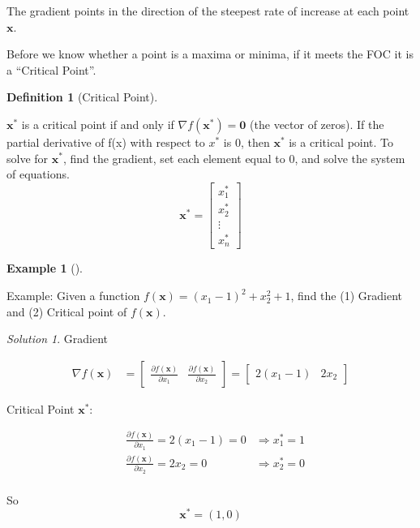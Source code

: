 \documentclass[
  letterpaper,
]{book}
\theoremstyle{definition}
\newtheorem{definition}{Definition}[chapter]
\theoremstyle{definition}
\newtheorem{example}{Example}[chapter]
\theoremstyle{plain}
\theoremstyle{definition}
\theoremstyle{plain}
\theoremstyle{plain}
\theoremstyle{remark}
\newtheorem*{solution}{Solution}
\begin{document}
The gradient points in the direction of the steepest rate of increase at
each point \(\mathbf{x}\).

Before we know whether a point is a maxima or minima, if it meets the
FOC it is a ``Critical Point''.

\leavevmode{}%
\begin{definition}[Critical Point]\label{def-}

\(\mathbf{x}^*\) is a critical point if and only if
\(\nabla f(\mathbf{x}^*)=\mathbf{0}\) (the vector of zeros). If the
partial derivative of f(x) with respect to \(x^*\) is 0, then
\(\mathbf{x}^*\) is a critical point. To solve for \(\mathbf{x}^*\),
find the gradient, set each element equal to 0, and solve the system of
equations.
\[\mathbf{x}^* = \begin{bmatrix} x_1^*\\x_2^*\\ \vdots \\ x_n^*\end{bmatrix}\]

\end{definition}

\leavevmode{}%
\begin{example}[]\label{exm-}

Example: Given a function \(f(\mathbf{x})=(x_1-1)^2+x_2^2+1\), find the
(1) Gradient and (2) Critical point of \(f(\mathbf{x})\).

\end{example}

\begin{solution}

Gradient

\begin{align*}
\nabla f(\mathbf{x}) &= 
  \begin{bmatrix}
  \frac{\partial f(\mathbf{x})}{\partial x_1} & 
  \frac{\partial f(\mathbf{x})}{\partial x_2} 
  \end{bmatrix}
  = 
  \begin{bmatrix} 2(x_1-1) &
  2x_2 
  \end{bmatrix}
\end{align*}

Critical Point \(\mathbf{x}^*\):

\begin{align*}
&\frac{\partial f(\mathbf{x})}{\partial x_1} = 2(x_1-1) = 0 & \Rightarrow x_1^* = 1\\
&\frac{\partial f(\mathbf{x})}{\partial x_2} = 2x_2 = 0 & \Rightarrow   x_2^* = 0\\
\end{align*}

So \[\mathbf{x}^* = (1,0)\]

\end{solution}
\end{document}

